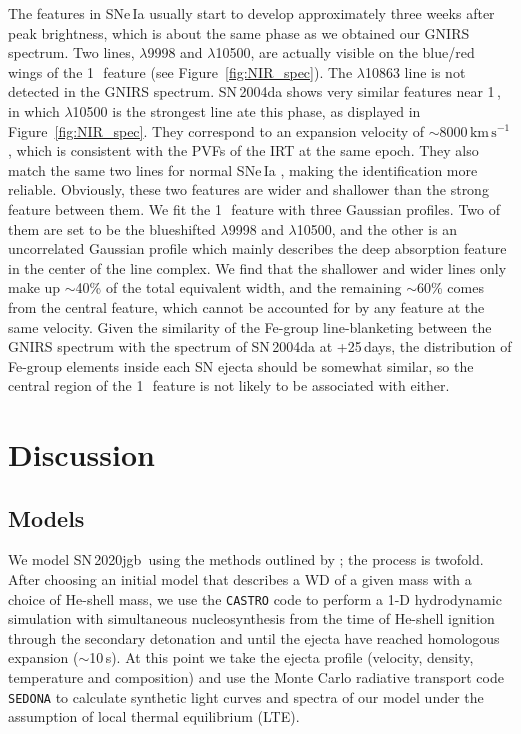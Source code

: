 \documentclass[twocolumn]{aastex631}
\newcommand{\sn}{SN\,2020jgb}
\newcommand{\kms}{$\mathrm{km}\,\mathrm{s}^{-1}$}
\begin{document}
\begin{CJK*}{UTF8}{gbsn}
The  features in SNe\,Ia usually start to develop approximately three weeks after peak brightness, which is about the same phase as we obtained our GNIRS spectrum. Two  lines, $\lambda$9998 and $\lambda$10500, are actually visible on the blue/red wings of the 1\,\micron\ feature (see Figure~\ref{fig:NIR_spec}). The  $\lambda$10863 line is not detected in the GNIRS spectrum. SN\,2004da shows very similar  features near 1\,\micron, in which  $\lambda$10500 is the strongest line ate this phase, as displayed in Figure~\ref{fig:NIR_spec}. They correspond to an expansion velocity of $\sim$8000\,\kms, which is consistent with the PVFs of the  IRT at the same epoch. They also match the same two lines for normal SNe\,Ia \citep{Marion2009_NIR}, making the identification more reliable. Obviously, these two  features are wider and shallower than the strong feature between them. We fit the 1\,\micron\ feature with three Gaussian profiles. Two of them are set to be the blueshifted  $\lambda$9998 and $\lambda$10500, and the other is an uncorrelated Gaussian profile which mainly describes the deep absorption feature in the center of the line complex. We find that the shallower and wider  lines only make up $\sim$40\% of the total equivalent width, and the remaining $\sim$60\% comes from the central feature, which cannot be accounted for by any  feature at the same velocity. Given the similarity of the Fe-group line-blanketing between the GNIRS spectrum with the spectrum of SN\,2004da at +25\,days, the distribution of Fe-group elements inside each SN ejecta should be somewhat similar, so the central region of the 1\,\micron\ feature is not likely to be associated with  either.

\section{Discussion} \label{sec:discussion}
\subsection{Models} \label{sec:model}
We model \sn\ using the methods outlined by \citet{polin_observational_2019}; the process is twofold. After choosing an initial model that describes a WD of a given mass with a choice of He-shell mass, we use the \texttt{CASTRO} code \citep{Almgren_Castro_2010} to perform a 1-D hydrodynamic simulation with simultaneous nucleosynthesis from the time of He-shell ignition through the secondary detonation and until the ejecta have reached homologous expansion ($\sim$10\,s). At this point we take the ejecta profile (velocity, density, temperature and composition) and use the Monte Carlo radiative transport code \texttt{SEDONA} \citep{Kasen_Sedona_2006} to calculate synthetic light curves and spectra of our model under the assumption of local thermal equilibrium (LTE). 


\end{CJK*}
\end{document}
